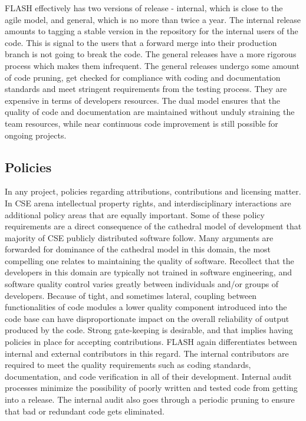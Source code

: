 FLASH effectively has two versions of release - internal, which
is close to the agile model, and general, which is no more than twice
a year. The internal release amounts to tagging a stable version in
the repository for the internal users of the code. This is signal to
the users that a forward merge into their production branch is not
going to break the code. The general releases have a more rigorous
process which makes them infrequent. The general releases undergo some
amount of code pruning, get checked for compliance with coding and
documentation standards and meet stringent requirements from the testing
process. They are expensive in terms of developers resources. The
dual model ensures that the quality of code and documentation are
maintained without unduly straining the team resources, while
near continuous code improvement is still possible for ongoing
projects. 
 
\subsection{Policies}
\label{sec:FLASHPolicies}
In any project, policies regarding attributions, contributions and
licensing matter. In CSE arena intellectual property rights,
and interdisciplinary interactions are additional policy
areas that are equally important. Some of these policy requirements
are a direct consequence of the cathedral model \cite{} of development that
majority of CSE publicly distributed software follow.  Many arguments
are forwarded for dominance of the cathedral model in this domain, the
most compelling one relates to maintaining the quality of
software. Recollect that the developers in this domain are typically
not trained in software engineering, and software quality control
varies greatly between individuals and/or groups of
developers. Because of tight, and sometimes lateral, coupling between
functionalities of code modules a lower quality component introduced
into the code base can have disproportionate impact on the overall
reliability of output produced by the code. Strong gate-keeping is
desirable, and that implies having policies in place for accepting
contributions. FLASH again differentiates between internal and
external contributors in this regard. The internal contributors are
required to meet the quality requirements such as coding standards,
documentation, and code verification in all of their
development. Internal audit processes minimize the possibility of
poorly written and tested code from getting into a release. The internal audit also goes
through a periodic pruning to ensure that bad or redundant code gets
eliminated.  

